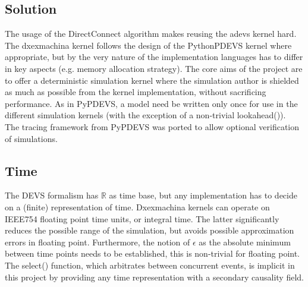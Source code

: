 \subsection{Solution} %
The usage of the DirectConnect\cite{SymbolicFlattening} algorithm makes reusing the adevs kernel hard.
The dxexmachina kernel follows the design of the PythonPDEVS kernel where appropriate, but by the very nature of the implementation languages has to differ in key aspects (e.g. memory allocation strategy). 
The core aims of the project are to offer a deterministic simulation kernel where the simulation author is shielded as much as possible from the kernel implementation, without sacrificing performance. As in PyPDEVS, a model need be written only once for use in the different simulation kernels (with the exception of a non-trivial lookahead()).\\
The tracing framework from PyPDEVS was ported to allow optional verification of simulations. 
\subsection{Time}
The DEVS formalism has $\mathbb{R}$ as time base, but any implementation has to decide on a (finite) representation of time. Dxexmachina kernels can operate on IEEE754 floating point time units, or integral time. The latter significantly reduces the possible range of the simulation, but avoids possible approximation errors in floating point. Furthermore, the notion of $\epsilon$ as the absolute minimum between time points needs to be established, this is non-trivial for floating point. \\
The select() function, which arbitrates between concurrent events, is implicit in this project by providing any time representation with a secondary causality field. 


